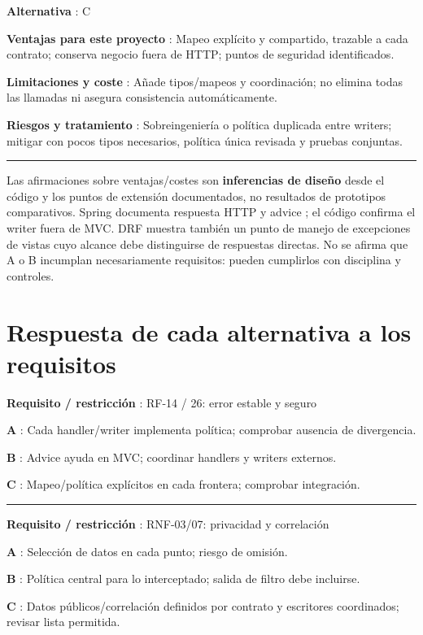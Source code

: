 \documentclass[12pt,a4paper]{report}
\begin{document}
\textbf{Alternativa }: C

\textbf{Ventajas para este proyecto }: Mapeo explícito y compartido,
trazable a cada contrato; conserva negocio fuera de HTTP; puntos de
seguridad identificados.

\textbf{Limitaciones y coste }: Añade tipos/mapeos y coordinación; no
elimina todas las llamadas ni asegura consistencia automáticamente.

\textbf{Riesgos y tratamiento }: Sobreingeniería o política duplicada
entre writers; mitigar con pocos tipos necesarios, política única
revisada y pruebas conjuntas.

\medskip\hrule\medskip

Las afirmaciones sobre ventajas/costes son \textbf{inferencias de
diseño} desde el código y los puntos de extensión documentados, no
resultados de prototipos comparativos. Spring documenta respuesta HTTP y
advice ; el código confirma el writer fuera de MVC. DRF muestra también un punto de manejo de excepciones de
vistas cuyo alcance debe distinguirse de respuestas directas.
No se afirma que A o B incumplan necesariamente requisitos: pueden
cumplirlos con disciplina y controles.

\section{Respuesta de cada alternativa a los
requisitos}\label{analisis-respuesta-de-cada-alternativa-a-los-requisitos}

\textbf{Requisito / restricción }: RF-14 / 26: error estable y
seguro

\textbf{A }: Cada handler/writer implementa política; comprobar ausencia
de divergencia.

\textbf{B }: Advice ayuda en MVC; coordinar handlers y writers externos.

\textbf{C }: Mapeo/política explícitos en cada frontera; comprobar
integración.

\medskip\hrule\medskip

\textbf{Requisito / restricción }: RNF-03/07: privacidad y
correlación

\textbf{A }: Selección de datos en cada punto; riesgo de omisión.

\textbf{B }: Política central para lo interceptado; salida de filtro
debe incluirse.

\textbf{C }: Datos públicos/correlación definidos por contrato y
escritores coordinados; revisar lista permitida.
\end{document}
